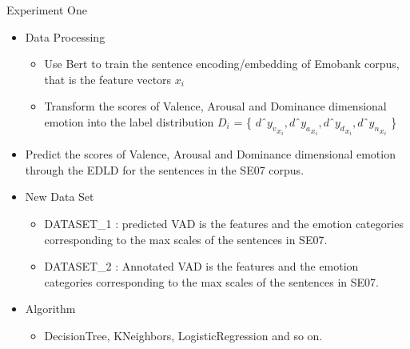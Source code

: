\documentclass[
 size=14pt,
 paper=smartboard,  %
 mode=present, 		%
 display=slides, 	%
 style=tuliplab,  	%
 pauseslide,
 fleqn,leqno]{powerdot}
\begin{document}
\begin{slide}{Experiment One}
	\begin{itemize}
		\item
		Data Processing
		
		\begin{itemize}
			\item 
			Use Bert to train the sentence encoding/embedding
			of Emobank corpus, that is the feature vectors $ x_{i} $
			\item 
			Transform the scores of Valence, Arousal and Dominance 
			dimensional emotion into 
			the label distribution 
			$ D_{i} $ = \{ 
			$ d ˆ {y_{v}} _{ x_{i} } , 
			d ˆ {y_{a}} _{ x_{i} } ,
			d ˆ {y_{d}} _{ x_{i} } ,
			d ˆ {y_{n}} _{ x_{i} }  $ \}
		\end{itemize}
		
		\item 
		Predict the scores of 
		Valence, Arousal and Dominance dimensional emotion
		through the EDLD
		for the sentences in the SE07 corpus.
		
		\item 
		New Data Set
		
		\begin{itemize}
			\item 
			DATASET_1 : predicted VAD is the features and 
			the emotion categories corresponding to 
			the max scales of the sentences in SE07.
			\item 
			DATASET_2 : Annotated VAD is the features and 
			the emotion categories corresponding to 
			the max scales of the sentences in SE07.
		\end{itemize}
		
		\item 
		Algorithm
		
		\begin{itemize}
			\item DecisionTree, KNeighbors, LogisticRegression and so on.
			
		\end{itemize}
	\end{itemize}
	
\end{slide}


\end{document}
